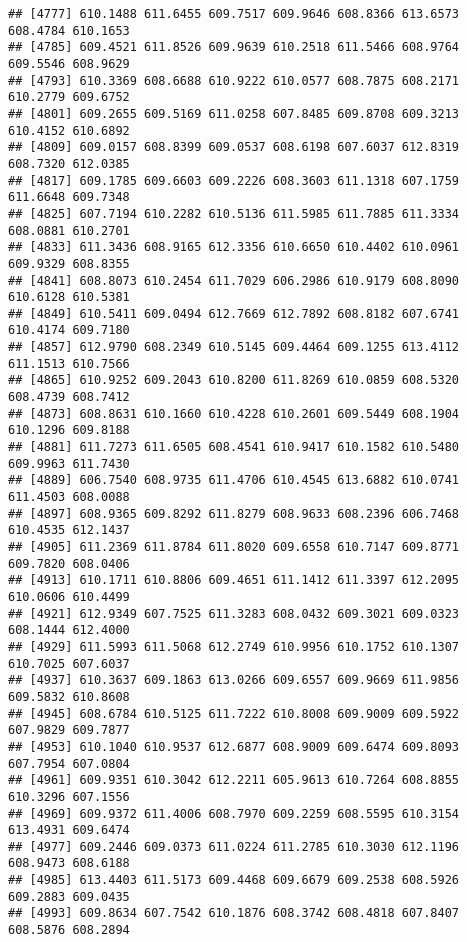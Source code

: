 \documentclass[
]{article}
\begin{document}
\begin{verbatim}
## [4777] 610.1488 611.6455 609.7517 609.9646 608.8366 613.6573 608.4784 610.1653
## [4785] 609.4521 611.8526 609.9639 610.2518 611.5466 608.9764 609.5546 608.9629
## [4793] 610.3369 608.6688 610.9222 610.0577 608.7875 608.2171 610.2779 609.6752
## [4801] 609.2655 609.5169 611.0258 607.8485 609.8708 609.3213 610.4152 610.6892
## [4809] 609.0157 608.8399 609.0537 608.6198 607.6037 612.8319 608.7320 612.0385
## [4817] 609.1785 609.6603 609.2226 608.3603 611.1318 607.1759 611.6648 609.7348
## [4825] 607.7194 610.2282 610.5136 611.5985 611.7885 611.3334 608.0881 610.2701
## [4833] 611.3436 608.9165 612.3356 610.6650 610.4402 610.0961 609.9329 608.8355
## [4841] 608.8073 610.2454 611.7029 606.2986 610.9179 608.8090 610.6128 610.5381
## [4849] 610.5411 609.0494 612.7669 612.7892 608.8182 607.6741 610.4174 609.7180
## [4857] 612.9790 608.2349 610.5145 609.4464 609.1255 613.4112 611.1513 610.7566
## [4865] 610.9252 609.2043 610.8200 611.8269 610.0859 608.5320 608.4739 608.7412
## [4873] 608.8631 610.1660 610.4228 610.2601 609.5449 608.1904 610.1296 609.8188
## [4881] 611.7273 611.6505 608.4541 610.9417 610.1582 610.5480 609.9963 611.7430
## [4889] 606.7540 608.9735 611.4706 610.4545 613.6882 610.0741 611.4503 608.0088
## [4897] 608.9365 609.8292 611.8279 608.9633 608.2396 606.7468 610.4535 612.1437
## [4905] 611.2369 611.8784 611.8020 609.6558 610.7147 609.8771 609.7820 608.0406
## [4913] 610.1711 610.8806 609.4651 611.1412 611.3397 612.2095 610.0606 610.4499
## [4921] 612.9349 607.7525 611.3283 608.0432 609.3021 609.0323 608.1444 612.4000
## [4929] 611.5993 611.5068 612.2749 610.9956 610.1752 610.1307 610.7025 607.6037
## [4937] 610.3637 609.1863 613.0266 609.6557 609.9669 611.9856 609.5832 610.8608
## [4945] 608.6784 610.5125 611.7222 610.8008 609.9009 609.5922 607.9829 609.7877
## [4953] 610.1040 610.9537 612.6877 608.9009 609.6474 609.8093 607.7954 607.0804
## [4961] 609.9351 610.3042 612.2211 605.9613 610.7264 608.8855 610.3296 607.1556
## [4969] 609.9372 611.4006 608.7970 609.2259 608.5595 610.3154 613.4931 609.6474
## [4977] 609.2446 609.0373 611.0224 611.2785 610.3030 612.1196 608.9473 608.6188
## [4985] 613.4403 611.5173 609.4468 609.6679 609.2538 608.5926 609.2883 609.0435
## [4993] 609.8634 607.7542 610.1876 608.3742 608.4818 607.8407 608.5876 608.2894
\end{verbatim}
\end{document}
